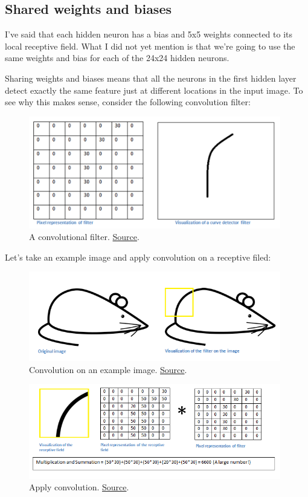 \documentclass[a4paper]{tufte-handout}
\begin{document}
\subsection{Shared weights and biases}

I've said that each hidden neuron has a bias and 5x5 weights connected
to its local receptive field. What I did not yet mention is that we're
going to use the same weights and bias for each of the 24x24 hidden
neurons.

Sharing weights and biases means that all the neurons in the first
hidden layer detect exactly the same feature just at different locations
in the input image. To see why this makes sense, consider the following
convolution filter:

\begin{figure}
\includegraphics[width=110mm]{conv_example1.png}
\caption{A convolutional filter.
\href{https://adeshpande3.github.io/adeshpande3.github.io/A-Beginner's-Guide-To-Understanding-Convolutional-Neural-Networks/}{Source}.
}
\end{figure}

Let's take an example image and apply convolution on a receptive filed:

\begin{figure}
\includegraphics[width=110mm]{conv_example2.png}
\caption{Convolution on an example image.
\href{https://adeshpande3.github.io/adeshpande3.github.io/A-Beginner's-Guide-To-Understanding-Convolutional-Neural-Networks/}{Source}.
}
\end{figure}

\begin{figure}
\includegraphics[width=110mm]{conv_example3.png}
\caption{Apply convolution.
\href{https://adeshpande3.github.io/adeshpande3.github.io/A-Beginner's-Guide-To-Understanding-Convolutional-Neural-Networks/}{Source}.
}
\end{figure}
\end{document}
